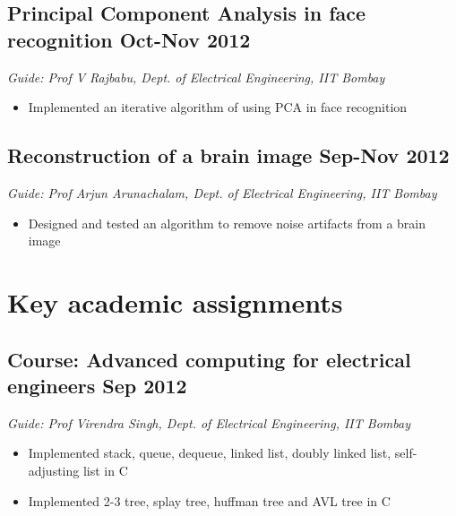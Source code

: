 \documentclass[11pt]{article}
\begin{document}
\subsection*{Principal Component Analysis in face recognition \hfill  Oct-Nov 2012} 
\emph{Guide: Prof V Rajbabu, Dept. of Electrical Engineering, IIT Bombay}  
\begin{itemize}
\item Implemented an iterative algorithm of using PCA in face recognition  
\end{itemize}

\subsection*{Reconstruction of a brain image \hfill  Sep-Nov 2012}
\emph{Guide: Prof Arjun Arunachalam, Dept. of Electrical Engineering, IIT Bombay}  
\begin{itemize}
\item Designed and tested an algorithm to remove noise artifacts from a brain image  
\end{itemize}




\section*{Key academic assignments}

\subsection*{Course: Advanced computing for electrical engineers \hfill Sep 2012}
\emph{Guide: Prof Virendra Singh, Dept. of Electrical Engineering, IIT Bombay}
\begin{itemize}
\item Implemented stack, queue, dequeue, linked list, doubly linked list, self-adjusting list in C
\item Implemented 2-3 tree, splay tree,  huffman tree and AVL tree in C
\end{itemize}
\end{document}
